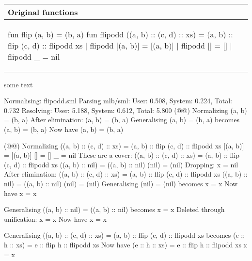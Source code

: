 \begin{example}[]\
  \label{ex:eval-normal-example-flipodd}\\
  
  \begin{center}
    \begin{tabular}{|l|}
      \hline
      \textbf{Original functions}
      \\\hline
      \begin{sml}
fun flip (a, b) = (b, a)
fun flipodd ((a, b) :: (c, d) :: xs) = (a, b) :: flip (c, d) 
                                              :: flipodd xs
  | flipodd [(a, b)] = [(a, b)]
  | flipodd [] = []
  | flipodd _ = nil        
      \end{sml}
      \\\hline
    \end{tabular}
  \end{center}
  
  some text
  
  \begin{narrow}{-3em}{0em}
    \setlength{\linewidth}{1.2\linewidth}
    \footnotesize
    
    \begin{multicols}{2}           
      \begin{sml}
Normalising: flipodd.sml
Parsing mlb/sml: 
  User: 0.508, System: 0.224, Total: 0.732
Resolving: 
  User: 5.188, System: 0.612, Total: 5.800
(@@)
Normalizing
  (a, b) = (b, a)
After elimination:
  (a, b) = (b, a)
Generalising
  (a, b) = (b, a)
becomes
  (a, b) = (b, a)
Now have
  (a, b) = (b, a)


(@@)
Normalizing
  ((a, b) :: (c, d) :: xs) = (a, b) :: flip (c, d) 
                                    :: flipodd xs
  [(a, b)] = [(a, b)]
  [] = []
  _ = nil
These are a cover:
  ((a, b) :: (c, d) :: xs) = (a, b) :: flip (c, d) 
                                    :: flipodd xs
  ((a, b) :: nil) = ((a, b) :: nil)
  (nil) = (nil)
Dropping:
  x = nil
After elimination:
  ((a, b) :: (c, d) :: xs) = (a, b) :: flip (c, d) 
                                    :: flipodd xs
  ((a, b) :: nil) = ((a, b) :: nil)
  (nil) = (nil)
Generalising
  (nil) = (nil)
becomes
  x = x
Now have
  x = x

Generalising
  ((a, b) :: nil) = ((a, b) :: nil)
becomes
  x = x
Deleted through unification:
  x = x
Now have
  x = x

Generalising
  ((a, b) :: (c, d) :: xs) = (a, b) :: flip (c, d) 
                                    :: flipodd xs
becomes
  (e :: h :: xs) = e :: flip h :: flipodd xs
Now have
  (e :: h :: xs) = e :: flip h :: flipodd xs
  x = x


\end{sml}
\end{multicols}
\end{narrow}
\end{example}
